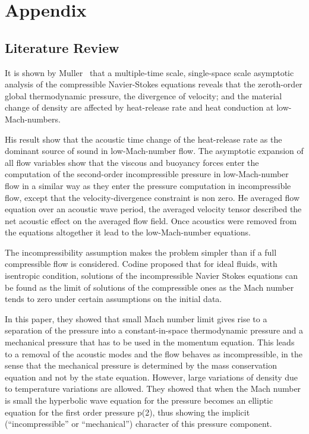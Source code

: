\chapter{Appendix}

\section{Literature Review}
It is shown by Muller~\cite{Muller} that a multiple-time scale, single-space scale asymptotic analysis of the compressible Navier-Stokes equations reveals that the zeroth-order global thermodynamic pressure, the divergence of velocity; and the material change of density are affected by heat-release rate and heat conduction at low-Mach-numbers.

\bigskip 
\noindent His result show that the acoustic time change of the heat-release rate as the dominant source of sound in low-Mach-number flow. The asymptotic expansion of all flow variables show that the viscous and buoyancy forces enter the computation of the second-order incompressible pressure in low-Mach-number flow in a similar way as they enter the pressure computation in incompressible flow, except that the
velocity-divergence constraint is non zero. He averaged flow equation over an acoustic wave period, the averaged velocity tensor described the net acoustic effect on the averaged flow field. Once acoustics were removed from the equations altogether it lead to the low-Mach-number equations.

\bigskip
\noindent The incompressibility assumption makes the problem simpler than if a full compressible flow is considered. Codine  proposed that for ideal fluids, with isentropic condition, solutions of the incompressible Navier Stokes equations can be found as the limit of solutions of the compressible ones as the Mach number tends to zero under certain assumptions on the initial data.

\noindent In this paper, they showed that small Mach number limit gives rise to a separation of the pressure into a constant-in-space thermodynamic pressure and a mechanical pressure that has to be used in the momentum equation. This leads to a removal of the acoustic modes and the flow behaves as incompressible, in the sense that the mechanical pressure is determined by the mass conservation
equation and not by the state equation. However, large variations of density
due to temperature variations are allowed. They showed that when the Mach number is small the hyperbolic wave equation for the pressure becomes an elliptic
equation for the first order pressure p(2), thus showing the implicit (“incompressible” or “mechanical”) character of this pressure component.



